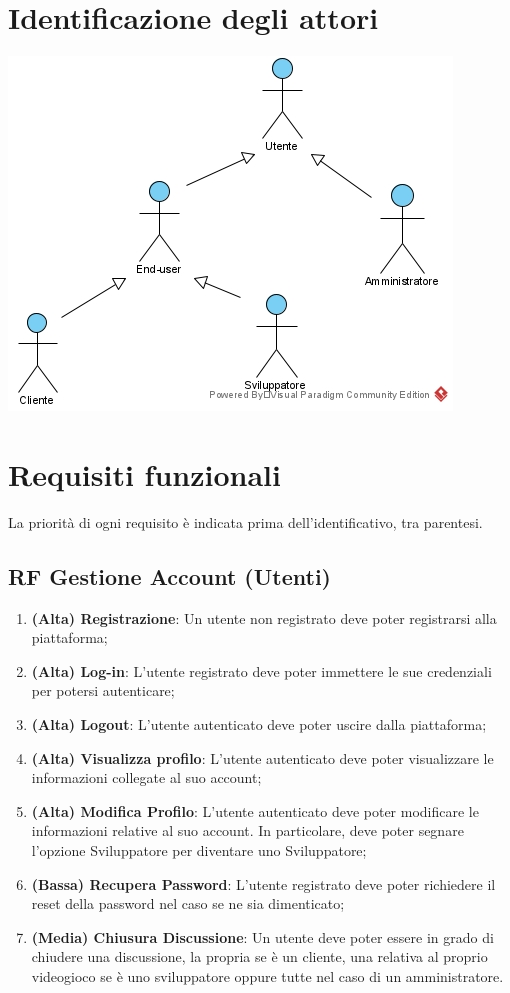 \section{Identificazione degli attori}
\begin{center}
\includegraphics{Figure/actorsDiagram.jpg}
\end{center}

\section{Requisiti funzionali}
La priorità di ogni requisito è indicata prima dell'identificativo, tra parentesi.
\subsection{RF Gestione Account (Utenti)}
\begin{enumerate}
	\item \textbf{(Alta) Registrazione}: Un utente non registrato deve poter registrarsi alla piattaforma;
	\item \textbf{(Alta) Log-in}: L’utente registrato deve poter immettere le sue credenziali per potersi autenticare;
	\item \textbf{(Alta) Logout}: L’utente autenticato deve poter uscire dalla piattaforma;
	\item \textbf{(Alta) Visualizza profilo}: L’utente autenticato deve poter visualizzare le informazioni collegate al suo account;
	\item \textbf{(Alta) Modifica Profilo}: L’utente autenticato deve poter modificare le informazioni relative al suo account. In particolare, deve poter segnare l’opzione Sviluppatore per diventare uno Sviluppatore;
	\item \textbf{(Bassa) Recupera Password}: L’utente registrato deve poter richiedere il reset della password nel caso se ne sia dimenticato;
	\item \textbf{(Media) Chiusura Discussione}: Un utente deve poter essere in grado di chiudere una discussione, la propria se è un cliente, una relativa al proprio videogioco se è uno sviluppatore oppure tutte nel caso di un amministratore.
\end{enumerate}

